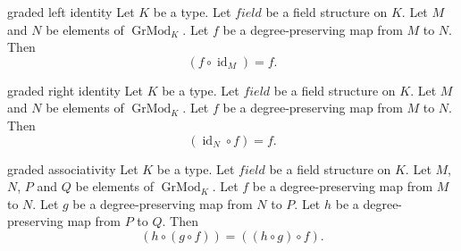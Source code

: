 \begin{cleanresult}{graded left identity}
Let $K$ be a type.
Let $\mathit{field}$ be a field structure on $K$.
Let $M$ and $N$ be elements of $\operatorname{GrMod}_{K}$.
Let $f$ be a degree-preserving map from $M$ to $N$.
Then \[(f \circ \operatorname{id}_{M}) = f.\]
\end{cleanresult}

\begin{cleanresult}{graded right identity}
Let $K$ be a type.
Let $\mathit{field}$ be a field structure on $K$.
Let $M$ and $N$ be elements of $\operatorname{GrMod}_{K}$.
Let $f$ be a degree-preserving map from $M$ to $N$.
Then \[(\operatorname{id}_{N} \circ f) = f.\]
\end{cleanresult}

\begin{cleanresult}{graded associativity}
Let $K$ be a type.
Let $\mathit{field}$ be a field structure on $K$.
Let $M$, $N$, $P$ and $Q$ be elements of $\operatorname{GrMod}_{K}$.
Let $f$ be a degree-preserving map from $M$ to $N$.
Let $g$ be a degree-preserving map from $N$ to $P$.
Let $h$ be a degree-preserving map from $P$ to $Q$.
Then \[(h \circ (g \circ f)) = ((h \circ g) \circ f).\]
\end{cleanresult}

